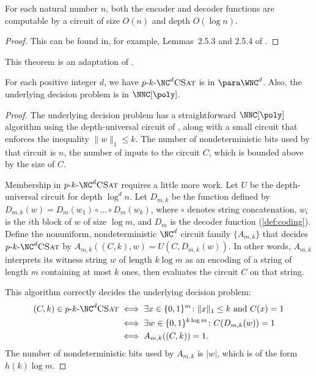 \documentclass{article}
\newcommand{\dash}{\textnormal{-}}
\newcommand{\pNCSAT}{p \dash k \dash \NC^d \textsc{CSat}}
\begin{document}
\begin{lemma}\label{lem:codingbounds}
  For each natural number $n$, both the encoder and decoder functions are computable by a circuit of size $O(n)$ and depth $O(\log n)$.
\end{lemma}
\begin{proof}
  This can be found in, for example, Lemmas~2.5.3 and 2.5.4 of \autocite{savage98}.
\end{proof}

This theorem is an adaptation of \autocite[Lemma~3.3]{cc97lim}.

\begin{lemma}\label{lem:pkncsat}
  For each positive integer $d$, we have $\pNCSAT$ is in $\para \WNC^d$.
  Also, the underlying decision problem is in $\NNC[\poly]$.
\end{lemma}
\begin{proof}
  The underlying decision problem has a straightforward $\NNC[\poly]$ algorithm using the depth-universal circuit of \autocite{ch85}, along with a small circuit that enforces the inequality $\|w\|_1 \leq k$.
  The number of nondeterministic bits used by that circuit is $n$, the number of inputs to the circuit $C$, which is bounded above by the size of $C$.

  Membership in $\pNCSAT$ requires a little more work.
  Let $U$ be the depth-universal circuit \autocite{ch85} for depth $\log^d n$.
  Let $D_{m, k}$ be the function defined by $D_{m, k}(w) = D_m(w_1) \circ \dotsc \circ D_m(w_k)$, where $\circ$ denotes string concatenation, $w_i$ is the $i$th block of $w$ of size $\log m$, and $D_m$ is the decoder function (\autoref{def:coding}).
  Define the nonuniform, nondeterministic $\NC^d$ circuit family $\{A_{m, k}\}$ that decides $\pNCSAT$ by $A_{m, k}((C, k), w) = U(C, D_{m, k}(w))$.
  In other words, $A_{m, k}$ interprets its witness string $w$ of length $k \log m$ as an encoding of a string of length $m$ containing at most $k$ ones, then evaluates the circuit $C$ on that string.

  This algorithm correctly decides the underlying decision problem:
  \begin{align*}
    (C, k) \in \pNCSAT & \iff \exists x \in \{0, 1\}^m \colon \|x\|_1 \leq k \text{ and } C(x) = 1 \\
    & \iff \exists w \in \{0, 1\}^{k \log m} \colon C(D_{m, k}(w)) = 1 \\
    & \iff A_{m, k}((C, k)) = 1.
  \end{align*}
  The number of nondeterministic bits used by $A_{m, k}$ is $|w|$, which is of the form $h(k) \log m$.


\end{proof}
\end{document}
